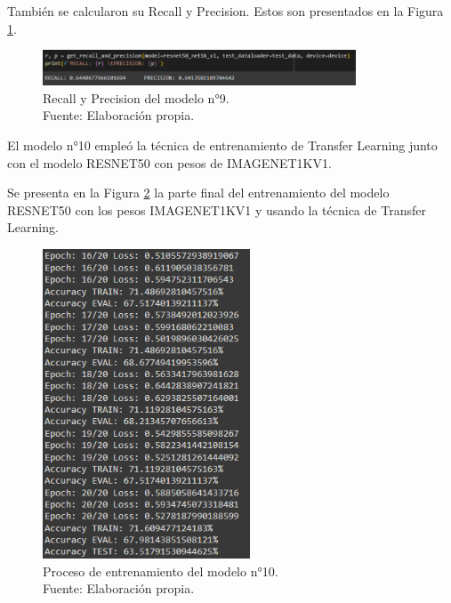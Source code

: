 También se calcularon su Recall y Precision. Estos son presentados en la Figura \ref{4:fig137}.

\begin{figure}[H]
	\begin{center}
		\includegraphics[width=0.83\textwidth]{4/figures/model9_rp.PNG}
		\caption[Recall y Precision del modelo n°9]{Recall y Precision del modelo n°9. \\
		Fuente: Elaboración propia.}
		\label{4:fig137}
	\end{center}
\end{figure}

El modelo n°10 empleó la técnica de entrenamiento de Transfer Learning  junto con el modelo RESNET50 con pesos de IMAGENET1KV1.

Se presenta en la Figura \ref{4:fig138} la parte final del entrenamiento del modelo RESNET50 con los pesos IMAGENET1KV1 y usando la técnica de Transfer Learning.

\begin{figure}[H]
	\begin{center}
		\includegraphics[width=0.55\textwidth]{4/figures/model10_train.PNG}
		\caption[Proceso de entrenamiento del modelo n°10]{Proceso de entrenamiento del modelo n°10. \\
		Fuente: Elaboración propia.}
		\label{4:fig138}
	\end{center}
\end{figure}

